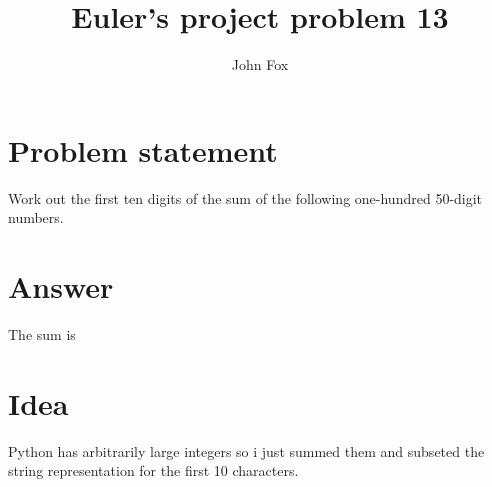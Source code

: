 \documentclass{article}
\title{Euler's project problem 13}
\author{John Fox}
\begin{document}
\maketitle
\large

\section*{Problem statement} 
Work out the first ten digits of the sum of the following one-hundred 50-digit numbers.

\section*{Answer}
The sum is 
\section*{Idea} Python has arbitrarily large integers so i just summed them and subseted the string representation for the first 10 characters. 
\end{document}
